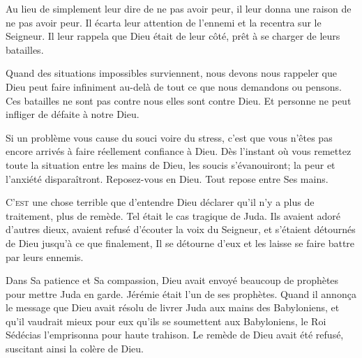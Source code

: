 Au lieu de simplement leur dire de ne pas avoir peur,
 il leur donna une raison de ne pas avoir peur.
 Il écarta leur attention de l'ennemi et la recentra sur le Seigneur.
 Il leur rappela que Dieu était de leur côté,
 prêt à se charger de leurs batailles.


Quand des situations impossibles surviennent,
 nous devons nous rappeler que Dieu peut faire infiniment au-delà
 de tout ce que nous demandons ou pensons.
 Ces batailles ne sont pas contre nous \ocadr{}elles sont contre Dieu.
 Et personne ne peut infliger de défaite à notre Dieu.

Si un problème vous cause du souci voire du stress,
 c'est que vous n'êtes pas encore arrivés à faire réellement
 confiance à Dieu.
 Dès l'instant où vous remettez toute la situation entre les mains de Dieu,
 les soucis s'évanouiront; la peur et l'anxiété disparaîtront.
 Reposez-vous en Dieu. Tout repose entre Ses mains. 

\dvrule







\lettrine{C}{'est} une chose terrible que d'entendre Dieu déclarer
 qu'il n'y a plus de traitement, plus de remède.
 Tel était le cas tragique de Juda.
 Ils avaient adoré d'autres dieux, avaient refusé d'écouter
 la voix du Seigneur, et s'étaient détournés de Dieu
 \ocadr{}jusqu'à ce que finalement, Il se détourne d'eux
 et les laisse se faire battre par leurs ennemis. 


Dans Sa patience et Sa compassion, Dieu avait envoyé beaucoup de prophètes
 pour mettre Juda en garde.
 Jérémie était l'un de ses prophètes.
 Quand il annon\c{c}a le message que Dieu avait résolu de livrer Juda
 aux mains des Babyloniens,
 et qu'il vaudrait mieux pour eux qu'ils se soumettent aux Babyloniens,
 le Roi Sédécias l'emprisonna pour haute trahison.
 Le remède de Dieu avait été refusé, suscitant ainsi la colère de Dieu.

